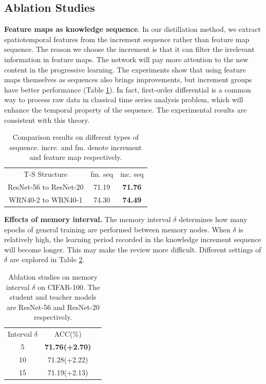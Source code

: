 \documentclass[letterpaper]{article} %
\begin{document}
\subsection{Ablation Studies}
\textbf{Feature maps as knowledge sequence}. In our distillation method, we extract spatiotemporal features from the increment sequence rather than feature map sequence. The reason we choose the increment is that it can filter the irrelevant information in feature maps. The network will pay more attention to the new content in the progressive learning.  The experiments show that using feature maps themselves as sequences also brings improvements, but increment groups have better performance (Table \ref{tab5}). In fact, first-order differential is a common way to process raw data in classical time series analysis problem, which will enhance the temporal property of the sequence. The experimental results are consistent with this theory.
\begin{table}[htbp]
\centering
\begin{tabular}{@{}c|cc@{}}
 T-S Structure  & fm. seq & inc. seq
\\ \Xhline{1.5pt}
 ResNet-56 to ResNet-20 & 71.19 &\textbf{71.76}
\\ \hline
 WRN40-2 to WRN40-1 &74.30 &\textbf{74.49}
\end{tabular}
\vspace{-6pt}
\caption{Comparison results on different types of sequence. incre. and fm. denote increment and feature map respectively. }
\label{tab5}
\end{table}

\noindent\textbf{Effects of memory interval.} The memory interval $\delta$ determines how many epochs of general training are performed between memory nodes. When $\delta$ is relatively high, the learning period recorded in the knowledge increment sequence will become longer. This may make the review more difficult. Different settings of $\delta$ are explored in Table \ref{tab6}.
\begin{table}[htbp]
\centering
\begin{tabular}{@{}c|cc@{}}
 Interval $\delta$ & ACC($\%$)
\\ \Xhline{1.5pt}
 5 &\textbf{71.76(+2.70)}
\\ \hline
10 &71.28(+2.22)
\\ \hline
15 &71.19(+2.13)
\end{tabular}
\vspace{-6pt}
\caption{Ablation studies on memory interval $\delta$ on CIFAR-100. The student and teacher models are ResNet-56 and ResNet-20 respectively. }
\label{tab6}
\end{table}
\end{document}
